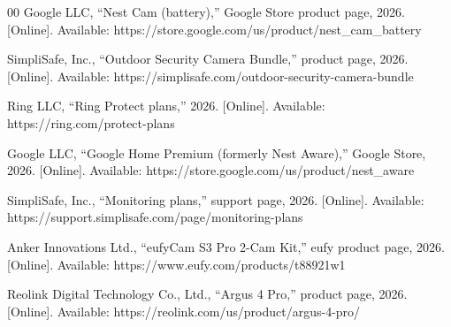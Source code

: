 \documentclass{ieeeaccess}
\begin{document}
\begin{thebibliography}{00}
 Google LLC, ``Nest Cam (battery),'' Google Store product page, 2026. [Online]. Available: https://store.google.com/us/product/nest\_cam\_battery

 SimpliSafe, Inc., ``Outdoor Security Camera Bundle,'' product page, 2026. [Online]. Available: https://simplisafe.com/outdoor-security-camera-bundle

 Ring LLC, ``Ring Protect plans,'' 2026. [Online]. Available: https://ring.com/protect-plans

 Google LLC, ``Google Home Premium (formerly Nest Aware),'' Google Store, 2026. [Online]. Available: https://store.google.com/us/product/nest\_aware

 SimpliSafe, Inc., ``Monitoring plans,'' support page, 2026. [Online]. Available: https://support.simplisafe.com/page/monitoring-plans

 Anker Innovations Ltd., ``eufyCam S3 Pro 2-Cam Kit,'' eufy product page, 2026. [Online]. Available: https://www.eufy.com/products/t88921w1

 Reolink Digital Technology Co., Ltd., ``Argus 4 Pro,'' product page, 2026. [Online]. Available: https://reolink.com/us/product/argus-4-pro/

\end{thebibliography}

\EOD
\end{document}
